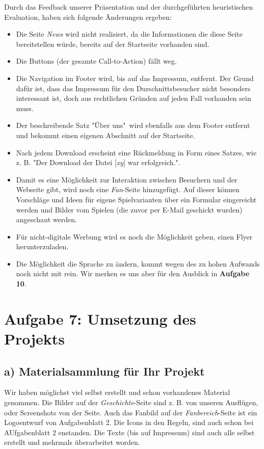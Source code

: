 \documentclass{scrartcl}
\begin{document}
Durch das Feedback unserer Präsentation und der durchgeführten heuristischen Evaluation, haben sich folgende Änderungen ergeben:
\begin{itemize}
\item Die Seite \textit{News} wird nicht realisiert, da die Informationen die diese Seite bereitstellen würde, bereits auf der Startseite vorhanden sind.
\item Die Buttons (der gesamte Call-to-Action) fällt weg.
\item Die Navigation im Footer wird, bis auf das Impressum, entfernt. Der Grund dafür ist, dass das Impressum für den Durschnittsbesucher nicht besonders interessant ist, doch aus rechtlichen Gründen auf jeden Fall vorhanden sein muss.
\item Der beschreibende Satz "Über uns"\ wird ebenfalls aus dem Footer entfernt und bekommt einen eigenen Abschnitt auf der Startseite.
\item Nach jedem Download erscheint eine Rückmeldung in Form eines Satzes, wie z. B. "Der Download der Datei [\textit{xy}] war erfolgreich.".
\item Damit es eine Möglichkeit zur Interaktion zwischen Besuchern und der Webseite gibt, wird noch eine \textit{Fan}-Seite hinzugefügt. Auf dieser können Vorschläge und Ideen für eigene Spielvarianten über ein Formular eingereicht werden und Bilder vom Spielen (die zuvor per E-Mail geschickt wurden) angeschaut werden.
\item Für nicht-digitale Werbung wird es noch die Möglichkeit geben, einen Flyer herunterzuladen.
\item Die Möglichkeit die Sprache zu ändern, kommt wegen des zu hohen Aufwands noch nicht mit rein. Wir merken es uns aber für den Ausblick in \textbf{Aufgabe 10}.
\end{itemize}

\section*{Aufgabe 7: Umsetzung des Projekts}
\subsection*{a) Materialsammlung für Ihr Projekt}
Wir haben möglichst viel selbst erstellt und schon vorhandenes Material genommen. Die Bilder auf der \textit{Geschichte}-Seite sind z. B. von unseren Ausflügen, oder Screenshots von der Seite. Auch das Fanbild auf der \textit{Fanbereich}-Seite ist ein Logoentwurf von Aufgabenblatt 2. Die Icons in den Regeln, sind auch schon bei AUfgabenblatt 2 enstanden. Die Texte (bis auf Impressum) sind auch alle selbst erstellt und mehrmals überarbeitet worden.
\end{document}
